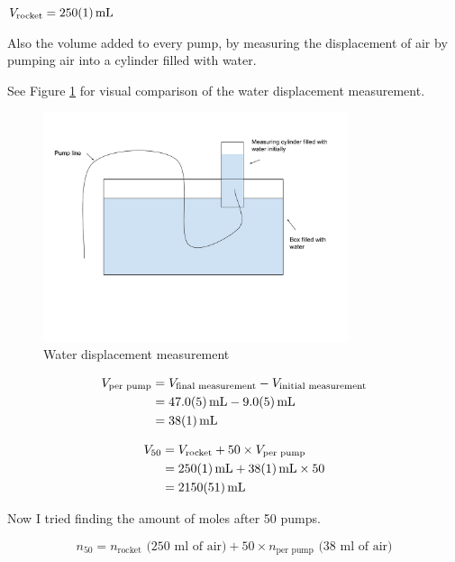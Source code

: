\documentclass[12pt,a4paper]{article}
\begin{document}
$V_{\text{rocket}} = \SI{250 \pm 1}{\milli\liter}$

Also the volume added to every pump, by measuring the displacement of air by pumping air into a cylinder filled with water.

See Figure \ref{fig:water_displacement} for visual comparison of the water displacement measurement.

\begin{figure}[H]
\centering
\includegraphics[width=0.8\textwidth]{measuring the water displacement.pdf}
\caption{Water displacement measurement}
\label{fig:water_displacement}
\end{figure}

\begin{align}
V_{\text{per pump}} &= V_{\text{final measurement}} - V_{\text{initial measurement}} \\
&= \SI{47.0 \pm 0.5}{\milli\liter} - \SI{9.0 \pm 0.5}{\milli\liter} \\
&= \SI{38 \pm 1}{\milli\liter}
\end{align}

\begin{align}
V_{50} &= V_{\text{rocket}} + 50 \times V_{\text{per pump}} \\
&= \SI{250 \pm 1}{\milli\liter} + \SI{38 \pm 1}{\milli\liter} \times 50 \\
&= \SI{2150 \pm 51}{\milli\liter}
\end{align}

Now I tried finding the amount of moles after 50 pumps.

\begin{equation}
n_{50} = n_{\text{rocket}} \text{ (250 ml of air)} + 50 \times n_{\text{per pump}} \text{ (38 ml of air)}
\end{equation}
\end{document}
